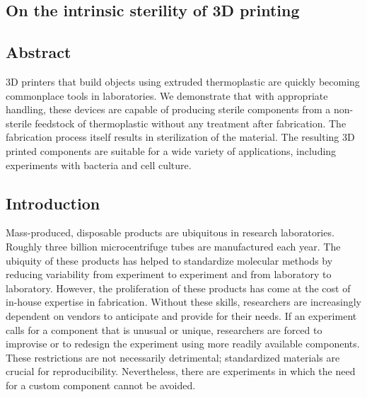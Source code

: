 \begin{refsection}

\chapter{On the intrinsic sterility of 3D printing}



\section{Abstract} 

3D printers that build objects using extruded thermoplastic are
quickly becoming commonplace tools in laboratories. We demonstrate
that with appropriate handling, these devices are capable of producing
sterile components from a non-sterile feedstock of thermoplastic
without any treatment after fabrication. The fabrication process
itself results in sterilization of the material. The resulting 3D
printed components are suitable for a wide variety of applications,
including experiments with bacteria and cell culture.

\section{Introduction}

Mass-produced, disposable products are ubiquitous in research
laboratories.  Roughly three billion microcentrifuge tubes are
manufactured each year. \cite{eppy} The ubiquity of these products has
helped to standardize molecular methods by reducing variability from
experiment to experiment and from laboratory to laboratory. However,
the proliferation of these products has come at the cost of in-house
expertise in fabrication. Without these skills, researchers are
increasingly dependent on vendors to anticipate and provide for their
needs. If an experiment calls for a component that is unusual or
unique, researchers are forced to improvise or to redesign the
experiment using more readily available components. These restrictions
are not necessarily detrimental; standardized materials are crucial
for reproducibility. Nevertheless, there are experiments in which the
need for a custom component cannot be avoided.


\end{refsection}
